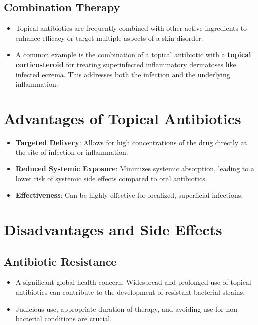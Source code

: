 \documentclass{article}
\begin{document}
\subsection*{Combination Therapy}
\begin{itemize}
    \item Topical antibiotics are frequently combined with other active ingredients to enhance efficacy or target multiple aspects of a skin disorder.
    \item A common example is the combination of a topical antibiotic with a \textbf{topical corticosteroid} for treating superinfected inflammatory dermatoses like infected eczema. This addresses both the infection and the underlying inflammation.
\end{itemize}

\section*{Advantages of Topical Antibiotics}
\begin{itemize}
    \item \textbf{Targeted Delivery}: Allows for high concentrations of the drug directly at the site of infection or inflammation.
    \item \textbf{Reduced Systemic Exposure}: Minimizes systemic absorption, leading to a lower risk of systemic side effects compared to oral antibiotics.
    \item \textbf{Effectiveness}: Can be highly effective for localized, superficial infections.
\end{itemize}

\section*{Disadvantages and Side Effects}

\subsection*{\textbf{Antibiotic Resistance}}
\begin{itemize}
    \item A significant global health concern. Widespread and prolonged use of topical antibiotics can contribute to the development of resistant bacterial strains.
    \item Judicious use, appropriate duration of therapy, and avoiding use for non-bacterial conditions are crucial.
\end{itemize}
\end{document}
